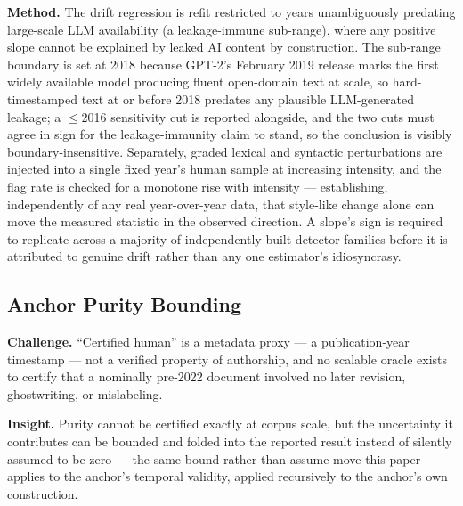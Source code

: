 \documentclass[conference]{IEEEtran}
\begin{document}
\textbf{Method.} The drift regression is refit restricted to years unambiguously predating large-scale LLM availability (a leakage-immune sub-range), where any positive slope cannot be explained by leaked AI content by construction. The sub-range boundary is set at 2018 because GPT-2's February 2019 release marks the first widely available model producing fluent open-domain text at scale, so hard-timestamped text at or before 2018 predates any plausible LLM-generated leakage; a $\leq$2016 sensitivity cut is reported alongside, and the two cuts must agree in sign for the leakage-immunity claim to stand, so the conclusion is visibly boundary-insensitive. Separately, graded lexical and syntactic perturbations are injected into a single fixed year's human sample at increasing intensity, and the flag rate is checked for a monotone rise with intensity --- establishing, independently of any real year-over-year data, that style-like change alone can move the measured statistic in the observed direction. A slope's sign is required to replicate across a majority of independently-built detector families before it is attributed to genuine drift rather than any one estimator's idiosyncrasy.

\subsection{Anchor Purity Bounding}

\textbf{Challenge.} ``Certified human'' is a metadata proxy --- a publication-year timestamp --- not a verified property of authorship, and no scalable oracle exists to certify that a nominally pre-2022 document involved no later revision, ghostwriting, or mislabeling.

\textbf{Insight.} Purity cannot be certified exactly at corpus scale, but the uncertainty it contributes can be bounded and folded into the reported result instead of silently assumed to be zero --- the same bound-rather-than-assume move this paper applies to the anchor's temporal validity, applied recursively to the anchor's own construction.
\end{document}
